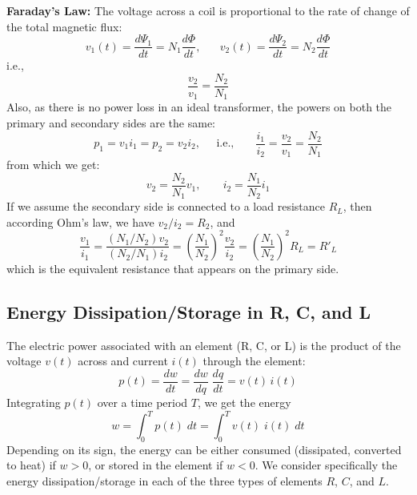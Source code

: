 \documentclass{article}
\begin{document}
\begin{itemize}
  {\bf Faraday's Law:} The voltage across a coil is proportional to 
  the rate of change of the total magnetic flux: 
  \begin{equation} 
    v_1(t)=\frac{d\Psi_1}{dt}=N_1\frac{d\Phi}{dt},\;\;\;\;\;\;
    v_2(t)=\frac{d\Psi_2}{dt}=N_2\frac{d\Phi}{dt} 
  \end{equation}
  i.e.,
  \begin{equation}
    \frac{v_2}{v_1}=\frac{N_2}{N_1}	
  \end{equation}
  Also, as there is no power loss in an ideal transformer, the powers on
  both the primary and secondary sides are the same:
  \begin{equation}
    p_1=v_1 i_1=p_2=v_2 i_2,\;\;\;\;\;\mbox{i.e.,}\;\;\;\;\;\;\;
    \frac{i_1}{i_2}=\frac{v_2}{v_1}=\frac{N_2}{N_1}
  \end{equation}
  from which we get:
  \begin{equation}
    v_2=\frac{N_2}{N_1} v_1,\;\;\;\;\;\;\;i_2=\frac{N_1}{N_2} i_1
  \end{equation}
  If we assume the secondary side is connected to a load resistance $R_L$,
  then according Ohm's law, we have $v_2/i_2=R_2$, and
  \begin{equation}
    \frac{v_1}{i_1}=\frac{(N_1/N_2)v_2}{(N_2/N_1)i_2}
    =\left(\frac{N_1}{N_2}\right)^2 \frac{v_2}{i_2}
    =\left(\frac{N_1}{N_2}\right)^2 R_L=R'_L 
  \end{equation}
  which is the equivalent resistance that appears on the primary side.

\end{itemize}


\subsection*{Energy Dissipation/Storage in R, C, and L}

The electric power associated with an element (R, C, or L) is the 
product of the voltage $v(t)$ across and current $i(t)$ through the
element:
\begin{equation} 
  p(t)=\frac{dw}{dt}=\frac{dw}{dq}\;\frac{dq}{dt}=v(t)\,i(t)
\end{equation}
Integrating $p(t)$ over a time period $T$, we get the energy 
\begin{equation}
  w=\int_0^T p(t)\; dt=\int_0^T v(t)\; i(t)\; dt	
\end{equation}
Depending on its sign, the energy can be either consumed (dissipated,
converted to heat) if $w>0$, or stored in the element if $w<0$. We 
consider specifically the energy dissipation/storage in each of 
the three types of elements $R$, $C$, and $L$.
\end{document}
